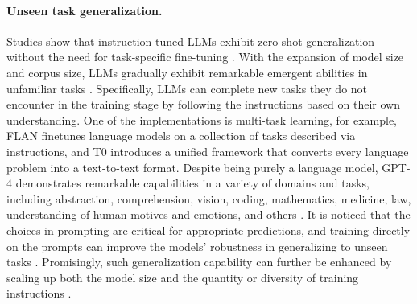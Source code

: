 \paragraph{Unseen task generalization.} \label{unseen task generalization}
Studies show that instruction-tuned LLMs exhibit zero-shot generalization without the need for task-specific fine-tuning \cite{DBLP:conf/nips/Ouyang0JAWMZASR22, DBLP:journals/corr/abs-2303-08774, DBLP:conf/iclr/WeiBZGYLDDL22, DBLP:conf/iclr/SanhWRBSACSRDBX22, DBLP:journals/corr/abs-2210-11416}. With the expansion of model size and corpus size, LLMs gradually exhibit remarkable emergent abilities in unfamiliar tasks \cite{DBLP:journals/corr/abs-2302-04023}. Specifically, LLMs can complete new tasks they do not encounter in the training stage by following the instructions based on their own understanding. One of the implementations is multi-task learning, for example, FLAN \cite{DBLP:conf/iclr/WeiBZGYLDDL22} finetunes language models on a collection of tasks described via instructions, and T0 \cite{DBLP:conf/iclr/SanhWRBSACSRDBX22} introduces a unified framework that converts every language problem into a text-to-text format. Despite being purely a language model, GPT-4 \cite{DBLP:journals/corr/abs-2303-08774} demonstrates remarkable capabilities in a variety of domains and tasks, including abstraction, comprehension, vision, coding, mathematics, medicine, law, understanding of human motives and emotions, and others \cite{DBLP:journals/corr/abs-2303-12712}. It is noticed that the choices in prompting are critical for appropriate predictions, and training directly on the prompts can improve the models' robustness in generalizing to unseen tasks \cite{DBLP:conf/acl/BachSYWRNSKBFAD22}. Promisingly, such generalization capability can further be enhanced by scaling up both the model size and the quantity or diversity of training instructions \cite{DBLP:journals/corr/abs-2304-08354, DBLP:journals/corr/abs-2212-12017}.

